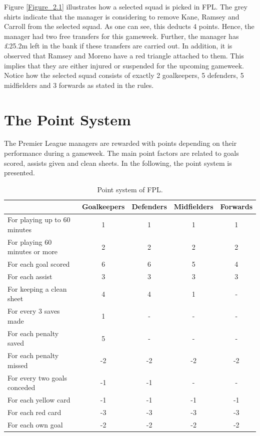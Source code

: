 Figure \ref{Figure_2.1} illustrates how a selected squad is picked in FPL. The grey shirts indicate that the manager is considering to remove Kane, Ramsey and Carroll from the selected squad. As one can see, this deducts 4 points. Hence, the manager had two free transfers for this gameweek. Further, the manager has \pounds 25.2m left in the bank if these transfers are carried out. In addition, it is observed that Ramsey and Moreno have a red triangle attached to them. This implies that they are either injured or suspended for the upcoming gameweek. Notice how the selected squad consists of exactly 2 goalkeepers, 5 defenders, 5 midfielders and 3 forwards as stated in the rules. 


\section{The Point System} \label{point_system}

The Premier League managers are rewarded with points depending on their performance during a gameweek. The main point factors are related to goals scored, assists given and clean sheets. In the following, the point system is presented. 

\begin{table}[H]
\centering
\small
\begin{tabular}{|l|c|c|c|c|}
\hline
                               & Goalkeepers & Defenders & Midfielders & Forwards \\
\hline
For playing up to 60 minutes   & 1           & 1         & 1           & 1        \\
For playing 60 minutes or more & 2           & 2         & 2           & 2        \\
For each goal scored           & 6           & 6         & 5           & 4        \\
For each assist                & 3           & 3         & 3           & 3        \\
For keeping a clean sheet      & 4           & 4         & 1           & -        \\
For every 3 saves made         & 1           & -         & -           & -        \\
For each penalty saved         & 5           & -         & -           & -        \\
For each penalty missed        & -2          & -2        & -2          & -2       \\
For every two goals conceded   & -1          & -1        & -           & -        \\
For each yellow card           & -1          & -1        & -1          & -1       \\
For each red card              & -3          & -3        & -3          & -3       \\
For each own goal              & -2          & -2        & -2          & -2      \\
\hline
\end{tabular}
\caption{Point system of FPL.}
\end{table}

